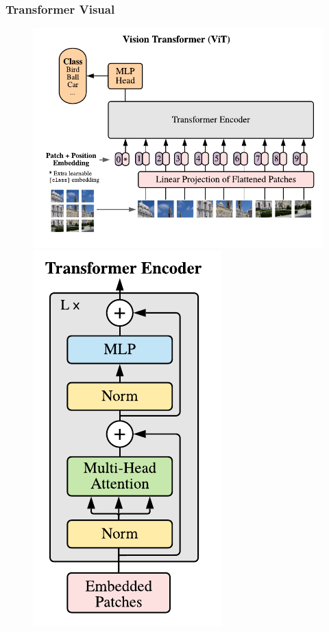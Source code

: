 \documentclass{beamer}
\begin{document}
\begin{frame}
    \frametitle{Transformer Visual}

    \begin{figure}[!ht]
        \centering
        \includegraphics[width=0.7\columnwidth]{
            Imagens/vit.png
        }
        \includegraphics[width=0.2\columnwidth]{
            Imagens/encoder.png
        }
        \caption{\cite{dosovitskiy2020image}}
        \label{fig:vit}
    \end{figure}
\end{frame}
\end{document}
